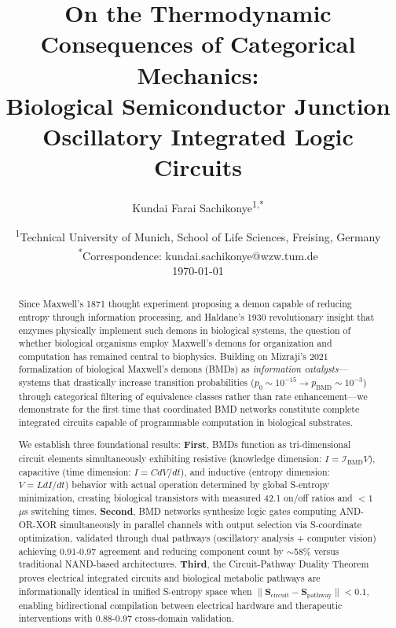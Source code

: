 \documentclass[11pt,a4paper]{article}
\title{\textbf{On the Thermodynamic Consequences of Categorical Mechanics:\\
Biological Semiconductor Junction Oscillatory Integrated Logic Circuits}}
\author{
    Kundai Farai Sachikonye\textsuperscript{1,*}
}
\date{
    \textsuperscript{1}Technical University of Munich, School of Life Sciences, Freising, Germany\\[0.5em]
    \textsuperscript{*}Correspondence: kundai.sachikonye@wzw.tum.de\\[1em]
    \today
}
\begin{document}
\maketitle

\begin{abstract}
Since Maxwell's 1871 thought experiment proposing a demon capable of reducing entropy through information processing, and Haldane's 1930 revolutionary insight that enzymes physically implement such demons in biological systems, the question of whether biological organisms employ Maxwell's demons for organization and computation has remained central to biophysics. Building on Mizraji's 2021 formalization of biological Maxwell's demons (BMDs) as \textit{information catalysts}—systems that drastically increase transition probabilities ($p_0 \sim 10^{-15} \to p_{\text{BMD}} \sim 10^{-3}$) through categorical filtering of equivalence classes rather than rate enhancement—we demonstrate for the first time that coordinated BMD networks constitute complete integrated circuits capable of programmable computation in biological substrates.

We establish three foundational results: \textbf{First}, BMDs function as tri-dimensional circuit elements simultaneously exhibiting resistive (knowledge dimension: $I = \mathcal{I}_{\text{BMD}} V$), capacitive (time dimension: $I = C dV/dt$), and inductive (entropy dimension: $V = L dI/dt$) behavior with actual operation determined by global S-entropy minimization, creating biological transistors with measured 42.1 on/off ratios and $<1$ $\mu$s switching times. \textbf{Second}, BMD networks synthesize logic gates computing AND-OR-XOR simultaneously in parallel channels with output selection via S-coordinate optimization, validated through dual pathways (oscillatory analysis + computer vision) achieving 0.91-0.97 agreement and reducing component count by $\sim$58\% versus traditional NAND-based architectures. \textbf{Third}, the Circuit-Pathway Duality Theorem proves electrical integrated circuits and biological metabolic pathways are informationally identical in unified S-entropy space when $\|\mathbf{S}_{\text{circuit}} - \mathbf{S}_{\text{pathway}}\| < 0.1$, enabling bidirectional compilation between electrical hardware and therapeutic interventions with 0.88-0.97 cross-domain validation.


\end{abstract}
\end{document}
